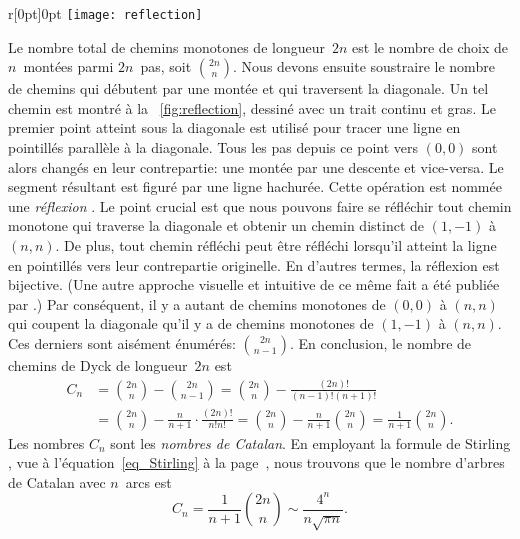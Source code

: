 \begin{wrapfigure}[14]{r}[0pt]{0pt}
\centering
\texttt{[image: reflection]}
\caption{Réflexion d'un préfixe par rapport à \(y = x - 1\)
\label{fig:reflection}}
\end{wrapfigure}
Le nombre total de chemins monotones de longueur~\(2n\) est le nombre
de choix de \(n\)~montées parmi \(2n\)~pas, soit
\(\binom{2n}{n}\). Nous devons ensuite soustraire le nombre de chemins
qui débutent par une montée et qui traversent la diagonale. Un tel
chemin est montré à la \fig~\ref{fig:reflection}, dessiné avec un
trait continu et gras. Le premier point atteint sous la diagonale est
utilisé pour tracer une ligne en pointillés parallèle à la
diagonale. Tous les pas depuis ce point vers \((0,0)\) sont alors
changés en leur contrepartie: une montée par une descente et
vice-versa. Le segment résultant est figuré par une ligne
hachurée. Cette opération est nommée une \emph{réflexion}
\citep{Renault_2008}. Le point crucial est que nous pouvons faire se
réfléchir tout chemin monotone qui traverse la diagonale et obtenir un
chemin distinct de \((1,-1)\) à \((n,n)\). De plus, tout chemin
réfléchi peut être réfléchi lorsqu'il atteint la ligne en pointillés
vers leur contrepartie originelle. En d'autres termes, la réflexion
est bijective. (Une autre approche visuelle et intuitive de ce même
fait a été publiée par \cite{Callan_1995}.) Par conséquent, il y a
autant de chemins monotones de \((0,0)\) à \((n,n)\) qui coupent la
diagonale qu'il y a de chemins monotones de \((1,-1)\) à \((n,n)\). Ces derniers sont aisément énumérés: \(\binom{2n}{n-1}\). En conclusion, le nombre de chemins de Dyck de longueur~\(2n\)
est\label{eq_Ann}
\begin{align*}
C_n &= \binom{2n}{n} - \binom{2n}{n-1}
= \binom{2n}{n} - \frac{(2n)!}{(n-1)!(n+1)!}\\
&= \binom{2n}{n} - \frac{n}{n+1} \cdot \frac{(2n)!}{n!n!}
 = \binom{2n}{n} - \frac{n}{n+1} \binom{2n}{n} = \frac{1}{n+1}\binom{2n}{n}.
\end{align*}
Les nombres \(C_n\) sont les \emph{nombres de Catalan}.
En employant la formule de Stirling , vue à
l'équation~\eqref{eq_Stirling} à la page~\pageref{eq_Stirling}, nous trouvons que le nombre d'arbres de Catalan avec \(n\)~arcs est
\begin{equation}
  C_n = \frac{1}{n+1}\binom{2n}{n} \sim \frac{4^n}{n\sqrt{\pi n}}.
\label{eq_Cn}
\end{equation}

